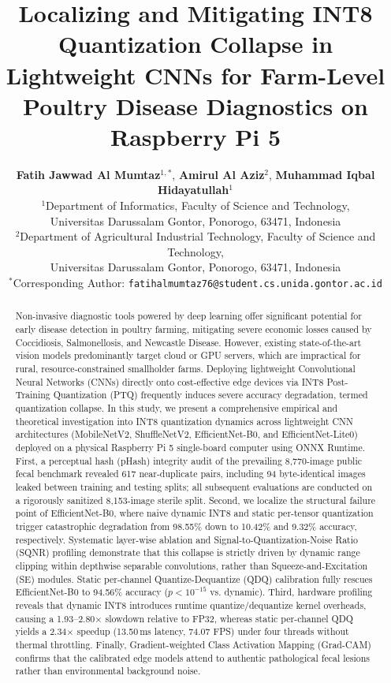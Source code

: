 \documentclass[11pt,a4paper]{article}
\title{\textbf{\Large Localizing and Mitigating INT8 Quantization Collapse in Lightweight CNNs for Farm-Level Poultry Disease Diagnostics on Raspberry Pi 5}}
\author{
\textbf{Fatih Jawwad Al Mumtaz}$^{1,*}$, 
\textbf{Amirul Al Aziz}$^{2}$, 
\textbf{Muhammad Iqbal Hidayatullah}$^{1}$ \\[1em]
$^{1}$Department of Informatics, Faculty of Science and Technology, \\
Universitas Darussalam Gontor, Ponorogo, 63471, Indonesia \\
$^{2}$Department of Agricultural Industrial Technology, Faculty of Science and Technology, \\
Universitas Darussalam Gontor, Ponorogo, 63471, Indonesia \\[0.5em]
$^{*}$Corresponding Author: \texttt{fatihalmumtaz76@student.cs.unida.gontor.ac.id}
}
\date{}
\begin{document}
\maketitle

\begin{abstract}
\noindent Non-invasive diagnostic tools powered by deep learning offer significant potential for early disease detection in poultry farming, mitigating severe economic losses caused by Coccidiosis, Salmonellosis, and Newcastle Disease. However, existing state-of-the-art vision models predominantly target cloud or GPU servers, which are impractical for rural, resource-constrained smallholder farms. Deploying lightweight Convolutional Neural Networks (CNNs) directly onto cost-effective edge devices via INT8 Post-Training Quantization (PTQ) frequently induces severe accuracy degradation, termed quantization collapse. In this study, we present a comprehensive empirical and theoretical investigation into INT8 quantization dynamics across lightweight CNN architectures (MobileNetV2, ShuffleNetV2, EfficientNet-B0, and EfficientNet-Lite0) deployed on a physical Raspberry Pi 5 single-board computer using ONNX Runtime. First, a perceptual hash (pHash) integrity audit of the prevailing 8,770-image public fecal benchmark revealed 617 near-duplicate pairs, including 94 byte-identical images leaked between training and testing splits; all subsequent evaluations are conducted on a rigorously sanitized 8,153-image sterile split. Second, we localize the structural failure point of EfficientNet-B0, where naive dynamic INT8 and static per-tensor quantization trigger catastrophic degradation from 98.55\% down to 10.42\% and 9.32\% accuracy, respectively. Systematic layer-wise ablation and Signal-to-Quantization-Noise Ratio (SQNR) profiling demonstrate that this collapse is strictly driven by dynamic range clipping within depthwise separable convolutions, rather than Squeeze-and-Excitation (SE) modules. Static per-channel Quantize-Dequantize (QDQ) calibration fully rescues EfficientNet-B0 to 94.56\% accuracy ($p < 10^{-15}$ vs. dynamic). Third, hardware profiling reveals that dynamic INT8 introduces runtime quantize/dequantize kernel overheads, causing a 1.93--2.80$\times$ slowdown relative to FP32, whereas static per-channel QDQ yields a 2.34$\times$ speedup (13.50\,ms latency, 74.07 FPS) under four threads without thermal throttling. Finally, Gradient-weighted Class Activation Mapping (Grad-CAM) confirms that the calibrated edge models attend to authentic pathological fecal lesions rather than environmental background noise.
\end{abstract}
\end{document}
